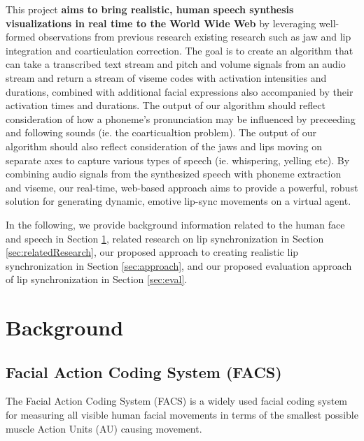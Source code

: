 \documentclass[12pt]{article}
\begin{document}
 This project {\bf aims to bring realistic, human speech synthesis visualizations in real time to the World Wide Web} by leveraging well-formed observations from previous research existing research such as jaw and lip integration and coarticulation correction.
The goal is to create an algorithm that can take a transcribed text stream and pitch and volume signals from an audio stream and return a stream of viseme codes with activation intensities and durations, combined with additional facial expressions also accompanied by their activation times and durations.  The  output of our algorithm should reflect consideration of how a phoneme's pronunciation may be influenced by preceeding and following sounds (ie. the coarticualtion problem). The output of our algorithm should also reflect consideration of the jaws and lips moving on separate axes to capture various types of speech (ie. whispering, yelling etc). 
By combining audio signals from the synthesized speech with phoneme extraction and viseme, our real-time, web-based approach aims to provide a powerful, robust solution for generating dynamic, emotive lip-sync movements on a virtual agent. 

In the following, we provide background information related to the human face and speech in Section \ref{sec:background}, related research on lip synchronization in Section \ref{sec:relatedResearch}, our proposed approach to creating realistic lip synchronization in Section \ref{sec:approach}, and our proposed evaluation approach of  lip synchronization in Section \ref{sec:eval}.
\newpage
\section{Background}
\label{sec:background}

\subsection{Facial Action Coding System (FACS)}
\label{sec:FACS}

The Facial Action Coding System (FACS) \cite{Ekman1976MeasuringMovement} is a widely
used facial coding system for measuring all visible human facial 
movements in terms of the smallest possible muscle Action
Units (AU) causing movement. 
\end{document}
